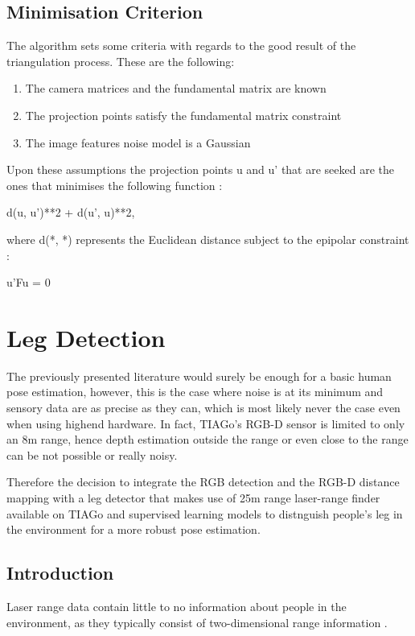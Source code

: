 \subsection{Minimisation Criterion}

The algorithm sets some criteria with regards to the good result of the triangulation process. These are the following:

\begin{enumerate}
  \item The camera matrices and the fundamental matrix are known
  \item The projection points satisfy the fundamental matrix constraint
  \item The image features noise model is a Gaussian
\end{enumerate}

Upon these assumptions the projection points u and u' that are seeked are the ones that minimises the following function \cite{hartley1997triangulation}:

d(u, u')**2 + d(u', u)**2,

where d(*, *) represents the Euclidean distance subject to the epipolar constraint \cite{hartley1997triangulation}:

u'Fu = 0

\section{Leg Detection}

The previously presented literature would surely be enough for a basic human pose estimation, however, this is the case where noise is at its minimum and sensory data are as precise as they can, which is most likely never the case even when using highend hardware. In fact, TIAGo's RGB-D sensor is limited to only an 8m range, hence depth estimation outside the range or even close to the range can be not possible or really noisy.

Therefore the decision to integrate the RGB detection and the RGB-D distance mapping with a leg detector that makes use of 25m range laser-range finder available on TIAGo and supervised learning models to distnguish people's leg in the environment for a more robust pose estimation.

\subsection{Introduction}

Laser range data contain little to no information about people in the environment, as they typically consist of two-dimensional range information \cite{arras2007using}.

